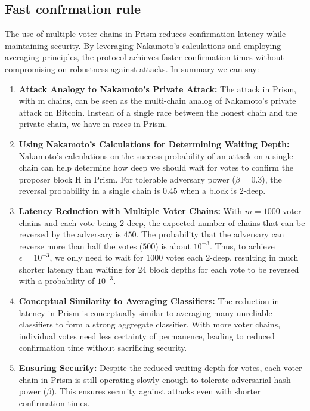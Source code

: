 \documentclass{report}
\begin{document}
\subsection{Fast confrmation rule}
The use of multiple voter chains in Prism reduces confirmation latency while maintaining security. By leveraging Nakamoto's calculations and employing averaging principles, the protocol achieves faster confirmation times without compromising on robustness against attacks. In summary we can say:
\begin{enumerate}
	\item \textbf{Attack Analogy to Nakamoto's Private Attack:} The attack in Prism, with m chains, can be seen as the multi-chain analog of Nakamoto's private attack on Bitcoin. Instead of a single race between the honest chain and the private chain, we have m races in Prism.
	\item \textbf{Using Nakamoto's Calculations for Determining Waiting Depth:} Nakamoto's calculations on the success probability of an attack on a single chain can help determine how deep we should wait for votes to confirm the proposer block H in Prism. For tolerable adversary power ($\beta = 0.3$), the reversal probability in a single chain is $0.45$ when a block is $2$-deep.
	\item \textbf{Latency Reduction with Multiple Voter Chains:} With $m = 1000$ voter chains and each vote being $2$-deep, the expected number of chains that can be reversed by the adversary is $450$. The probability that the adversary can reverse more than half the votes ($500$) is about $10^{-3}$. Thus, to achieve $\epsilon = 10^{-3}$, we only need to wait for $1000$ votes each $2$-deep, resulting in much shorter latency than waiting for $24$ block depths for each vote to be reversed with a probability of $10^{-3}$.
	\item \textbf{Conceptual Similarity to Averaging Classifiers:} The reduction in latency in Prism is conceptually similar to averaging many unreliable classifiers to form a strong aggregate classifier. With more voter chains, individual votes need less certainty of permanence, leading to reduced confirmation time without sacrificing security.
	\item \textbf{Ensuring Security:} Despite the reduced waiting depth for votes, each voter chain in Prism is still operating slowly enough to tolerate adversarial hash power ($β$). This ensures security against attacks even with shorter confirmation times.
\end{enumerate}
\end{document}
